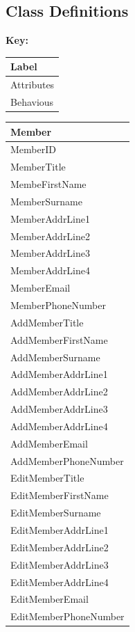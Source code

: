 \pagebreak
\subsection{Class Definitions}

\begin{flushleft}
\textbf{Key:}
\begin{tabular}{|p{4cm}|}
	\hline
	Label \\ \hline
	Attributes \\ \hline	
	Behavious \\ \hline
\end{tabular}


\end{flushleft}

\begin{tabular}{|p{4cm}|}
	\hline
	\textbf{Member} \\ \hline
	MemberID \\
	MemberTitle \\
	MembeFirstName \\
	MemberSurname \\
	MemberAddrLine1 \\
	MemberAddrLine2 \\
	MemberAddrLine3 \\
	MemberAddrLine4 \\
	MemberEmail \\
	MemberPhoneNumber \\ \hline	
		AddMemberTitle \\
		AddMemberFirstName \\
		AddMemberSurname \\
		AddMemberAddrLine1 \\
		AddMemberAddrLine2 \\
		AddMemberAddrLine3 \\
		AddMemberAddrLine4 \\
		AddMemberEmail \\
		AddMemberPhoneNumber \\ 
		EditMemberTitle \\
		EditMemberFirstName \\
		EditMemberSurname \\
		EditMemberAddrLine1 \\
		EditMemberAddrLine2 \\
		EditMemberAddrLine3 \\
		EditMemberAddrLine4 \\
		EditMemberEmail \\
		EditMemberPhoneNumber \\ \hline
\end{tabular}

